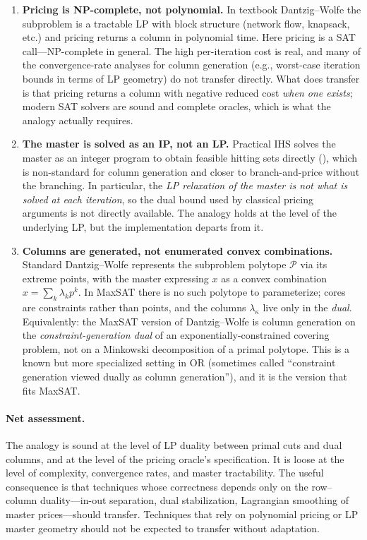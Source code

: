 \begin{enumerate}
\item \textbf{Pricing is NP-complete, not polynomial.} In textbook
Dantzig--Wolfe the subproblem is a tractable LP with block structure (network
flow, knapsack, etc.) and pricing returns a column in polynomial time. Here
pricing is a SAT call---NP-complete in general. The high per-iteration cost
is real, and many of the convergence-rate analyses for column generation (e.g.,
worst-case iteration bounds in terms of LP geometry) do not transfer directly.
What does transfer is that pricing returns a column with negative reduced cost
\emph{when one exists}; modern SAT solvers are sound and complete oracles,
which is what the analogy actually requires.
\item \textbf{The master is solved as an IP, not an LP.} Practical IHS solves
the master as an integer program to obtain feasible hitting sets directly
(\citealp{davies2013exploiting}), which is non-standard for column generation
and closer to branch-and-price without the branching. In particular, the
\emph{LP relaxation of the master is not what is solved at each iteration},
so the dual bound used by classical pricing arguments is not directly
available. The analogy holds at the level of the underlying LP, but the
implementation departs from it.
\item \textbf{Columns are generated, not enumerated convex combinations.}
Standard Dantzig--Wolfe represents the subproblem polytope $\mathcal{P}$ via
its extreme points, with the master expressing $x$ as a convex combination
$x = \sum_k \lambda_k p^k$. In MaxSAT there is no such polytope to
parameterize; cores are constraints rather than points, and the columns
$\lambda_\kappa$ live only in the \emph{dual}. Equivalently: the
MaxSAT version of Dantzig--Wolfe is column generation on the
\emph{constraint-generation dual} of an exponentially-constrained covering
problem, not on a Minkowski decomposition of a primal polytope. This is a
known but more specialized setting in OR (sometimes called ``constraint
generation viewed dually as column generation''), and it is the version
that fits MaxSAT.
\end{enumerate}

\paragraph{Net assessment.} The analogy is sound at the level of LP duality
between primal cuts and dual columns, and at the level of the pricing oracle's
specification. It is loose at the level of complexity, convergence rates, and
master tractability. The useful consequence is that techniques whose
correctness depends only on the row--column duality---in-out separation,
dual stabilization, Lagrangian smoothing of master prices---should transfer.
Techniques that rely on polynomial pricing or LP master geometry should not
be expected to transfer without adaptation.

